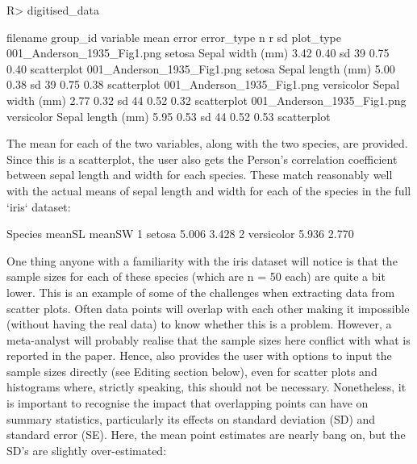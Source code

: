 \documentclass[article]{jss}
\begin{document}
\begin{CodeChunk}
\begin{CodeInput}
R> digitised_data
\end{CodeInput}
\begin{CodeOutput}
                  filename    group_id         variable  mean  error error_type  n     r    sd  plot_type
001_Anderson_1935_Fig1.png      setosa  Sepal width (mm)  3.42  0.40  sd        39  0.75  0.40  scatterplot
001_Anderson_1935_Fig1.png      setosa  Sepal length (mm) 5.00  0.38  sd        39  0.75  0.38  scatterplot
001_Anderson_1935_Fig1.png  versicolor  Sepal width (mm)  2.77  0.32  sd        44  0.52  0.32  scatterplot
001_Anderson_1935_Fig1.png  versicolor  Sepal length (mm) 5.95  0.53  sd        44  0.52  0.53  scatterplot
\end{CodeOutput}
\end{CodeChunk}

The mean for each of the two variables, along with the two species, are provided. Since this is a scatterplot, the user also gets the Person's correlation coefficient between sepal length and width for each species. These match reasonably well with the actual means of sepal length and width for each of the species in the full `iris` dataset:

\begin{CodeChunk}
\begin{CodeOutput}
     Species meanSL meanSW
1     setosa  5.006  3.428
2 versicolor  5.936  2.770
\end{CodeOutput}
\end{CodeChunk}

One thing anyone with a familiarity with the iris dataset will notice is that the sample sizes for each of these species (which are n = 50 each) are quite a bit lower. This is an example of some of the challenges when extracting data from scatter plots. Often data points will overlap with each other making it impossible (without having the real data) to know whether this is a problem. However, a meta-analyst will probably realise that the sample sizes here conflict with what is reported in the paper. Hence,  also provides the user with  options to input the sample sizes directly (see Editing section below), even for scatter plots and histograms where, strictly speaking, this should not be necessary. Nonetheless, it is important to recognise the impact that overlapping points can have on summary statistics, particularly its effects on standard deviation (SD) and standard error (SE). Here, the mean point estimates are nearly bang on, but the SD's are slightly over-estimated:
\end{document}
